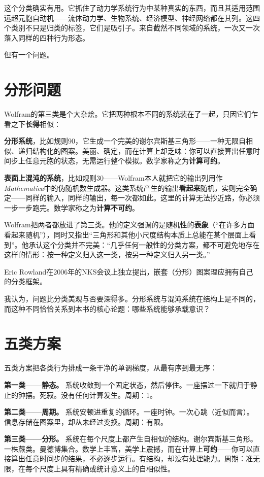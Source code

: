 \documentclass[11pt, twoside, openright]{book}
\begin{document}
这个分类确实有用。它抓住了动力学系统行为中某种真实的东西，而且其适用范围远超元胞自动机------流体动力学、生物系统、经济模型、神经网络都在其列。这四个类别不只是归类的标签，它们是吸引子。来自截然不同领域的系统，一次又一次落入同样的四种行为形态。

但有一个问题。

\section*{分形问题}

Wolfram的第三类是个大杂烩。它把两种根本不同的系统装在了一起，只因它们乍看之下\textbf{长得}相似：

\textbf{分形系统}，比如规则90，它生成一个完美的谢尔宾斯基三角形------一种无限自相似、递归结构化的图案。美丽、确定，而在计算上却乏味：你可以直接算出任意时间步上任意元胞的状态，无需运行整个模拟。数学家称之为\textbf{计算可约}。

\textbf{表面上混沌的系统}，比如规则30------Wolfram本人就把它的输出列用作\textit{Mathematica}中的伪随机数生成器。这类系统产生的输出\textbf{看起来}随机，实则完全确定------同样的输入，同样的输出，每一次都如此。这里的计算无法抄近路，你必须一步一步跑完。数学家称之为\textbf{计算不可约}。

Wolfram把两者都放进了第三类。他的定义强调的是随机性的\textbf{表象}（“在许多方面看起来随机”），同时又指出“三角形和其他小尺度结构本质上总能在某个层面上看到”。他承认这个分类并不完美：“几乎任何一般性的分类方案，都不可避免地存在这样的情形：按一种定义归入这一类，按另一种定义归入另一类。”

Eric Rowland在2006年的NKS会议上独立提出，嵌套（分形）图案理应拥有自己的分类框架。

我认为，问题比分类美观与否要深得多。分形系统与混沌系统在结构上是不同的，而这种不同恰恰关系到本书的核心论题：哪些系统能够承载意识？

\section*{五类方案}

五类方案把各类行为排成一条干净的单调梯度，从最有序到最无序：

\textbf{第一类------静态。} 系统收敛到一个固定状态，然后停住。一座摆过一下就归于静止的钟摆。死寂。没有任何计算发生。周期：1。

\textbf{第二类------周期。} 系统安顿进重复的循环。一座时钟。一次心跳（近似而言）。信息存储在图案里，却从未经过变换。周期：有限。

\textbf{第三类------分形。} 系统在每个尺度上都产生自相似的结构。谢尔宾斯基三角形。一株蕨类。曼德博集合。数学上丰富，美学上震撼，而在计算上\textbf{可约}------你可以直接算出任意时间步的结果，不必逐步运行。有结构，却没有处理能力。周期：准无限，在每个尺度上具有精确或统计意义上的自相似性。
\end{document}
